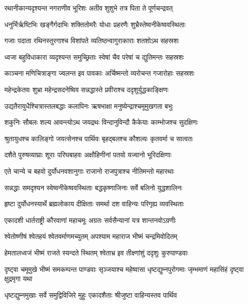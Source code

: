 \twolineshloka
{रथानीकान्यदृश्यन्त नगराणीव भूरिशः}
{अतीव शुशुभे तत्र पिता ते पूर्णचन्द्रवत्}


\twolineshloka
{धनुर्भिर्ऋष्टिभिः खङ्गैर्गदाभिः शक्तितोमरैः}
{योधाः प्रहरणैः शुभ्रैस्तेष्वनीकेष्ववस्थिताः}


\twolineshloka
{गजाः पदाता रथिनस्तुरगाश्च विशांपते}
{व्यतिष्ठन्वागुराकाराः शतशोऽथ सहस्रशः}


\twolineshloka
{ध्वजा बहुविधाकारा व्यदृश्यन्त समुच्छ्रिताः}
{स्वेषां चैव परेषां च द्युतिमन्तः सहस्रशः}


\twolineshloka
{काञ्चना मणिचित्राङ्गा ज्वलन्त इव पावकाः}
{अर्चिष्मन्तो व्यरोचन्त गजारोहाः सहस्रशः}


\twolineshloka
{महेन्द्रकेतवः शुभ्रा महेन्द्रसदनेष्विव}
{सन्नद्धास्ते प्रवीराश्च ददृशुर्युद्धकाङ्क्षिणः}


\twolineshloka
{उद्यतैरायुधैश्चित्रास्तलबद्धाः कलापिनः}
{ऋषभाक्षा मनुष्येन्द्राश्चमूमुखगता बभुः}


\twolineshloka
{शकुनिः सौबलः शल्य आवन्त्योऽथ जयद्रथः}
{विन्दानुविन्दौ कैकेयाः काम्भोजश्च सुदक्षिणः}


\twolineshloka
{श्रुतायुधश्च कालिङ्गो जयत्सेनश्च पार्थिवः}
{बृहद्बलश्च कौशल्यः कृतवर्मा च सात्वतः}


\twolineshloka
{दशैते पुरुषव्याघ्राः शूराः परिघबाहवः}
{अक्षौहिणीनां पतयो यज्वानो भूरिदक्षिणाः}


\twolineshloka
{एते चान्ये च बहवो दुर्योधनवशानुगाः}
{राजानो राजपुत्राश्च नीतिमन्तो महारथाः}


\twolineshloka
{सन्नद्धाः समदृश्यन स्वेष्वनीकेष्ववस्थिताः}
{बद्धकृष्णाजिनाः सर्वे बलिनो युद्धशालिनः}


\twolineshloka
{हृष्टा दुर्योधनस्यार्थे ब्रह्मलोकाय दीक्षिताः}
{समर्था दश वाहिन्यः परिगृह्य व्यवस्थिताः}


\twolineshloka
{एकादशी धार्तराष्ट्री कौरवाणां महाचमूः}
{अग्रतः सर्वसैन्यानां यत्र शान्तनवोऽग्रणीः}


\twolineshloka
{श्वेतोष्णीषं श्वेतहयं श्वेतवर्माणमच्युतम्}
{अपश्याम महाराज भीष्मं चन्द्रमिवोदितम्}


\twolineshloka
{हेमतालध्वजं भीष्मं राजते स्यन्दते स्थितम्}
{श्वेताभ्र इव तीक्ष्णांशुं ददृशुः कुरुपाण्डवाः}


\threelineshloka
{दृष्ट्वा चमूमुखे भीष्मं समकम्पन्त पाण्डवाः}
{सृञ्जयाश्च महेष्वासा धृष्टद्युम्नपुरोगमाः}
{जृम्भमाणं महासिंहं दृष्ट्वा क्षुद्रमृगा यथा}


\twolineshloka
{धृष्टद्युम्नमुखाः सर्वे समुद्विविजिरे मुहुः}
{एकादशैताः श्रीजुष्टा वाहिन्यस्तव पार्थिव}


